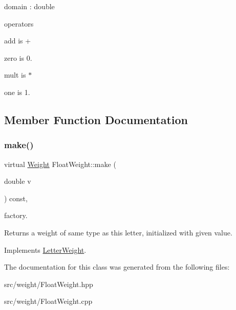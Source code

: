 \begin{DoxyItemize}
\item domain \+: double
\item operators
\item add is +
\item zero is 0.
\item mult is $\ast$
\item one is 1. 
\end{DoxyItemize}

\subsection{Member Function Documentation}
\mbox{\label{classFloatWeight_a71464c94830161af2f0dd3df99fe6856}} 
\subsubsection{\texorpdfstring{make()}{make()}}
{\footnotesize\ttfamily virtual \mbox{\hyperlink{classWeight}{Weight}} Float\+Weight\+::make (\begin{DoxyParamCaption}\item[{double}]{v }\end{DoxyParamCaption}) const\hspace{0.3cm}{\ttfamily [inline]}, {\ttfamily [virtual]}}



factory. 

\begin{DoxyReturn}{Returns}
a weight of same type as this letter, initialized with given value. 
\end{DoxyReturn}


Implements \mbox{\hyperlink{classLetterWeight_af1f898e0845f59299440fc50a58fd2f1}{Letter\+Weight}}.



The documentation for this class was generated from the following files\+:\begin{DoxyCompactItemize}
\item 
src/weight/Float\+Weight.\+hpp\item 
src/weight/Float\+Weight.\+cpp\end{DoxyCompactItemize}
